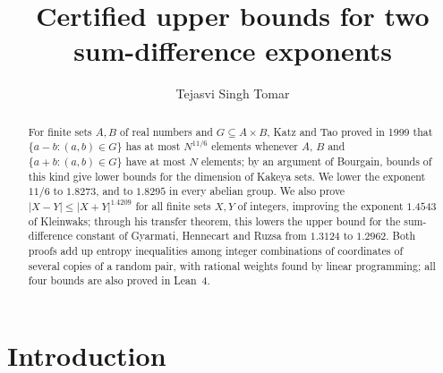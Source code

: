 \documentclass[11pt]{amsart}
\theoremstyle{definition}
\theoremstyle{remark}
\numberwithin{equation}{section}
\begin{document}
\title{Certified upper bounds for two sum-difference exponents}
\author{Tejasvi Singh Tomar}
\renewcommand{\urladdrname}{{\itshape ORCID}}

\begin{abstract}
For finite sets $A,B$ of real numbers and $G\subseteq A\times B$, Katz and Tao proved in 1999 that $\{a-b:(a,b)\in G\}$ has at most $N^{11/6}$ elements whenever $A$, $B$ and $\{a+b:(a,b)\in G\}$ have at most $N$ elements; by an argument of Bourgain, bounds of this kind give lower bounds for the dimension of Kakeya sets. We lower the exponent $11/6$ to $1.8273$, and to $1.8295$ in every abelian group. We also prove $|X-Y|\le|X+Y|^{1.4209}$ for all finite sets $X,Y$ of integers, improving the exponent $1.4543$ of Kleinwaks; through his transfer theorem, this lowers the upper bound for the sum-difference constant of Gyarmati, Hennecart and Ruzsa from $1.3124$ to $1.2962$. Both proofs add up entropy inequalities among integer combinations of coordinates of several copies of a random pair, with rational weights found by linear programming; all four bounds are also proved in Lean~4.
\end{abstract}

\maketitle

\section{Introduction}\label{sec:intro}
\end{document}
